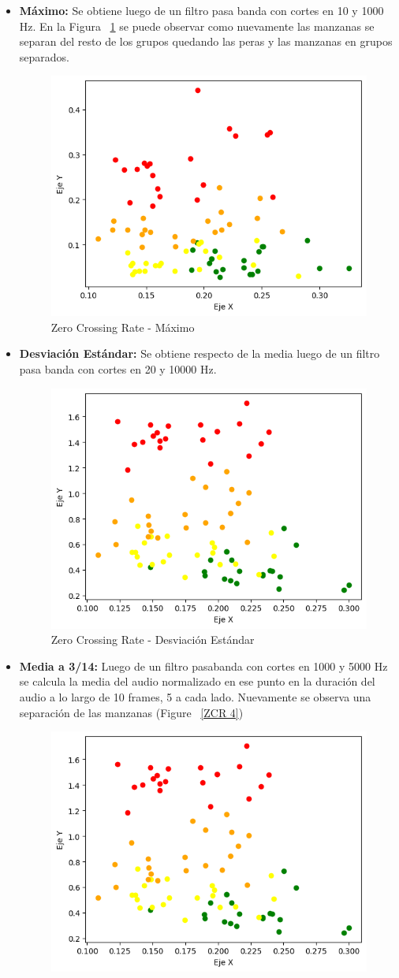 \documentclass[a4paper, 12pt]{article}
\begin{document}
\begin{itemize}
\begin{itemize}
\begin{figure}[h]
            \end{figure}
        \item \textbf{Máximo:} Se obtiene luego de un filtro pasa banda con cortes en 10 y 1000 Hz. En la Figura ~\ref{ZCR 2} se puede observar como nuevamente las manzanas se separan del resto de los grupos quedando las peras y las manzanas en grupos separados.
            \begin{figure}[h]
                \centering
                \includegraphics[width=0.4\linewidth]{ZCR2.png}
                \caption{Zero Crossing Rate - Máximo}
                \label{ZCR 2}
            \end{figure}
        \item \textbf{Desviación Estándar:} Se obtiene respecto de la media luego de un filtro pasa banda con cortes en 20 y 10000 Hz. 
            \begin{figure}[h]
                \centering
                \includegraphics[width=0.4\linewidth]{ZCR3.png}
                \caption{Zero Crossing Rate - Desviación Estándar}
                \label{ZCR 3}
            \end{figure}
        \item \textbf{Media a 3/14:} Luego de un filtro pasabanda con cortes en 1000 y 5000 Hz se calcula la media del audio normalizado en ese punto en la duración del audio a lo largo de 10 frames, 5 a cada lado. Nuevamente se observa una separación de las manzanas (Figure ~\ref{ZCR 4})
            \begin{figure}[h]
                \centering
                \includegraphics[width=0.4\linewidth]{ZCR3.png}

\end{figure}
\end{itemize}
\end{itemize}
\end{document}
